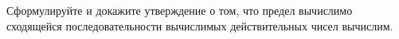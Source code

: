 Сформулируйте и докажите утверждение о том, что предел вычислимо сходящейся последовательности вычислимых
действительных чисел вычислим.
